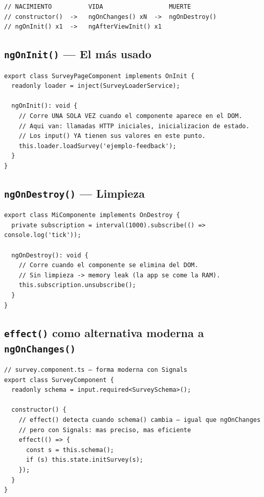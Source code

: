 \documentclass[12pt, a4paper]{article}
\begin{document}
\begin{lstlisting}
// NACIMIENTO          VIDA                  MUERTE
// constructor()  ->   ngOnChanges() xN  ->  ngOnDestroy()
// ngOnInit() x1  ->   ngAfterViewInit() x1
\end{lstlisting}

\subsection{ \texttt{ngOnInit()} — El más usado}
\begin{lstlisting}
export class SurveyPageComponent implements OnInit {
  readonly loader = inject(SurveyLoaderService);

  ngOnInit(): void {
    // Corre UNA SOLA VEZ cuando el componente aparece en el DOM.
    // Aqui van: llamadas HTTP iniciales, inicializacion de estado.
    // Los input() YA tienen sus valores en este punto.
    this.loader.loadSurvey('ejemplo-feedback');
  }
}
\end{lstlisting}

\subsection{ \texttt{ngOnDestroy()} — Limpieza}
\begin{lstlisting}
export class MiComponente implements OnDestroy {
  private subscription = interval(1000).subscribe(() => console.log('tick'));

  ngOnDestroy(): void {
    // Corre cuando el componente se elimina del DOM.
    // Sin limpieza -> memory leak (la app se come la RAM).
    this.subscription.unsubscribe();
  }
}
\end{lstlisting}

\subsection{ \texttt{effect()} como alternativa moderna a \texttt{ngOnChanges()}}
\begin{lstlisting}
// survey.component.ts — forma moderna con Signals
export class SurveyComponent {
  readonly schema = input.required<SurveySchema>();

  constructor() {
    // effect() detecta cuando schema() cambia — igual que ngOnChanges
    // pero con Signals: mas preciso, mas eficiente
    effect(() => {
      const s = this.schema();
      if (s) this.state.initSurvey(s);
    });
  }
}
\end{lstlisting}
\end{document}
